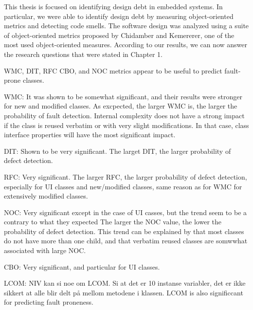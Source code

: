 
This thesis is focused on identifying design debt in embedded systems. In particular, we were able to identify design debt by measuring object-oriented metrics and detecting code smells. The software design was analyzed using a suite of object-oriented metrics proposed by Chidamber and Kemererer, one of the most used object-oriented measures. According to our results, we can now answer the research questions that were stated in Chapter 1.





WMC, DIT, RFC CBO, and NOC metrics appear to be useful to predict fault-prone classes. 

WMC: It was shown to be somewhat significant, and their results were stronger for new and modified classes. As excpected, the larger WMC is, the larger the probability of fault detection. Internal complexity does not have a strong impact if the class is reused verbatim or with very slight modifications. In that case, class interface properties will have the most significant impact.

DIT: Shown to be very significant. The larget DIT, the larger probability of defect detection.

RFC: Very significant. The larger RFC, the larger probability of defect detection, especially for UI classes and new/modified classes, same reason as for WMC for extensively modified classes.

NOC: Very significant except in the case of UI casses, but the trend seem to be a contrary to what they expected The larger the NOC value, the lower the probability of defect detection. This trend can be explained by that most classes do not have more than one child, and that verbatim reused classes are somwwhat associated with large NOC.

CBO: Very significant, and particular for UI classes.

LCOM: NIV kan si noe om LCOM. Si at det er 10 instanse variabler, det er ikke sikkert at alle blir delt på mellom metodene i klassen. LCOM is also significcant for predicting fault proneness.


